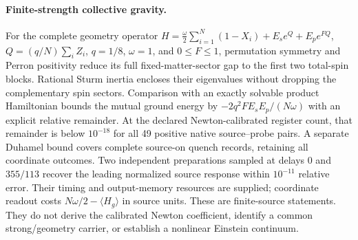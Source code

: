 \paragraph{Finite-strength collective gravity.}
For the complete geometry operator
$H=\frac{\omega}{2}\sum_{i=1}^N(1-X_i)+E_s e^Q+E_p e^{FQ}$,
$Q=(q/N)\sum_i Z_i$, $q=1/8$, $\omega=1$, and $0\leq F\leq1$,
permutation symmetry and Perron positivity reduce its full fixed-matter-sector
gap to the first two total-spin blocks. Rational Sturm inertia encloses their
eigenvalues without dropping the complementary spin sectors.
Comparison with an exactly solvable product Hamiltonian bounds the mutual
ground energy by $-2q^2FE_sE_p/(N\omega)$ with an explicit relative remainder.
At the declared Newton-calibrated register count, that remainder is below
$10^{-18}$ for all 49 positive native source--probe pairs. A separate Duhamel
bound covers complete source-on quench records, retaining all coordinate
outcomes. Two independent preparations sampled at delays $0$ and $355/113$
recover the leading normalized source response within $10^{-11}$ relative
error. Their timing and output-memory resources are supplied; coordinate
readout costs $N\omega/2-\langle H_g\rangle$ in source units.
These are finite-source statements. They do not derive the calibrated
Newton coefficient, identify a common strong/geometry carrier, or establish
a nonlinear Einstein continuum.
